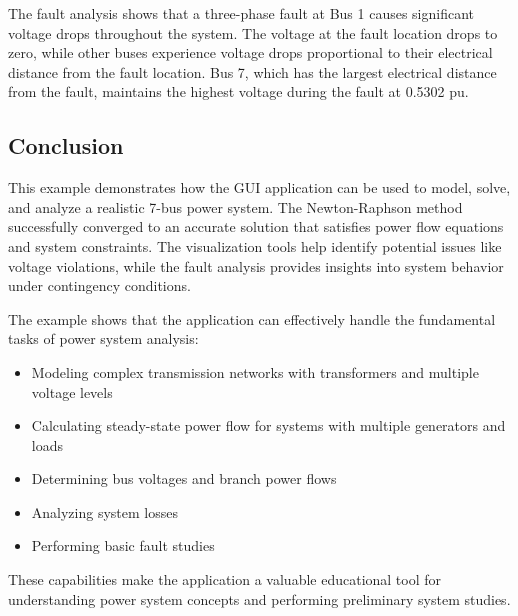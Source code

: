 \documentclass{article}
\begin{document}
	The fault analysis shows that a three-phase fault at Bus 1 causes significant voltage drops throughout the system. The voltage at the fault location drops to zero, while other buses experience voltage drops proportional to their electrical distance from the fault location. Bus 7, which has the largest electrical distance from the fault, maintains the highest voltage during the fault at 0.5302 pu.
	
	\subsection{Conclusion}
	
	This example demonstrates how the GUI application can be used to model, solve, and analyze a realistic 7-bus power system. The Newton-Raphson method successfully converged to an accurate solution that satisfies power flow equations and system constraints. The visualization tools help identify potential issues like voltage violations, while the fault analysis provides insights into system behavior under contingency conditions.
	
	The example shows that the application can effectively handle the fundamental tasks of power system analysis:
	\begin{itemize}
		\item Modeling complex transmission networks with transformers and multiple voltage levels
		\item Calculating steady-state power flow for systems with multiple generators and loads
		\item Determining bus voltages and branch power flows
		\item Analyzing system losses
		\item Performing basic fault studies
	\end{itemize}
	
	These capabilities make the application a valuable educational tool for understanding power system concepts and performing preliminary system studies.
	
\end{document}
